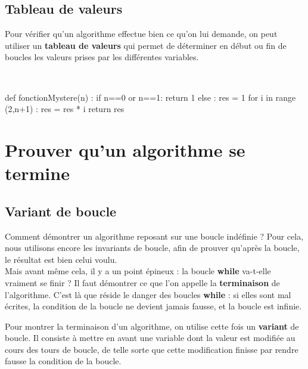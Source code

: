 \subsection{Tableau de valeurs}

\begin{defi}
Pour vérifier qu'un algorithme effectue bien ce qu'on lui demande, on peut utiliser un \textbf{tableau de valeurs} qui permet de déterminer en début ou fin de boucles les valeurs prises par les différentes variables.
\end{defi}


\begin{exemple}~\\

\begin{pyverbatim}
def fonctionMystere(n) :
    if n==0 or n==1:
         return 1
    else :
        res = 1
    for i in range (2,n+1) :
        res = res * i
    return res
\end{pyverbatim}



\end{exemple}


\section{Prouver qu'un algorithme se termine}

\subsection{Variant de boucle}

Comment démontrer un 
algorithme reposant sur une boucle indéfinie ? Pour cela, nous utilisons encore les invariants de 
boucle, afin de prouver qu'après la boucle, le résultat est bien celui voulu.\\
Mais avant même cela, il y a un point épineux : la boucle \textbf{while} va-t-elle vraiment se 
finir ? Il faut démontrer ce que l'on appelle la \textbf{terminaison} de l'algorithme. C'est là que 
réside le danger des boucles \textbf{while} : si elles sont mal écrites, la condition de la boucle 
ne devient jamais fausse, et la boucle est infinie.\\

\begin{defi}
Pour montrer la terminaison d'un algorithme, on utilise cette fois un \textbf{variant} de boucle. 
Il consiste à mettre en avant une variable dont la valeur est modifiée au cours des tours de 
boucle, de telle sorte que cette modification finisse par rendre fausse la condition de la boucle.\\
\end{defi}


